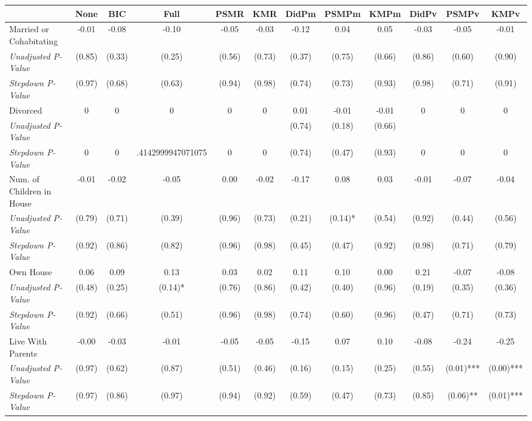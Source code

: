 \begin{tabular}{l c c c c c c c c c c c}
\toprule
 & None & BIC & Full & PSMR & KMR & DidPm & PSMPm & KMPm & DidPv & PSMPv & KMPv \\
\midrule
Married or Cohabitating & -0.01 & -0.08 & -0.10 & -0.05 & -0.03 & -0.12 & 0.04 & 0.05 & -0.03 & -0.05 & -0.01 \\
\quad \textit{Unadjusted P-Value} & (0.85) & (0.33) & (0.25) & (0.56) & (0.73) & (0.37) & (0.75) & (0.66) & (0.86) & (0.60) & (0.90) \\
\quad \textit{Stepdown P-Value} & (0.97) & (0.68) & (0.63) & (0.94) & (0.98) & (0.74) & (0.73) & (0.93) & (0.98) & (0.71) & (0.91) \\
Divorced & 0 & 0 & 0 & 0 & 0 & 0.01 & -0.01 & -0.01 & 0 & 0 & 0 \\
\quad \textit{Unadjusted P-Value} & & & & & & (0.74) & (0.18) & (0.66) & & & \\
\quad \textit{Stepdown P-Value} & 0 & 0 & .4142999947071075 & 0 & 0 & (0.74) & (0.47) & (0.93) & 0 & 0 & 0 \\
Num. of Children in House & -0.01 & -0.02 & -0.05 & 0.00 & -0.02 & -0.17 & 0.08 & 0.03 & -0.01 & -0.07 & -0.04 \\
\quad \textit{Unadjusted P-Value} & (0.79) & (0.71) & (0.39) & (0.96) & (0.73) & (0.21) & (0.14)* & (0.54) & (0.92) & (0.44) & (0.56) \\
\quad \textit{Stepdown P-Value} & (0.92) & (0.86) & (0.82) & (0.96) & (0.98) & (0.45) & (0.47) & (0.92) & (0.98) & (0.71) & (0.79) \\
Own House & 0.06 & 0.09 & 0.13 & 0.03 & 0.02 & 0.11 & 0.10 & 0.00 & 0.21 & -0.07 & -0.08 \\
\quad \textit{Unadjusted P-Value} & (0.48) & (0.25) & (0.14)* & (0.76) & (0.86) & (0.42) & (0.40) & (0.96) & (0.19) & (0.35) & (0.36) \\
\quad \textit{Stepdown P-Value} & (0.92) & (0.66) & (0.51) & (0.96) & (0.98) & (0.74) & (0.60) & (0.96) & (0.47) & (0.71) & (0.73) \\
Live With Parents & -0.00 & -0.03 & -0.01 & -0.05 & -0.05 & -0.15 & 0.07 & 0.10 & -0.08 & -0.24 & -0.25 \\
\quad \textit{Unadjusted P-Value} & (0.97) & (0.62) & (0.87) & (0.51) & (0.46) & (0.16) & (0.15) & (0.25) & (0.55) & (0.01)*** & (0.00)*** \\
\quad \textit{Stepdown P-Value} & (0.97) & (0.86) & (0.97) & (0.94) & (0.92) & (0.59) & (0.47) & (0.73) & (0.85) & (0.06)** & (0.01)*** \\
\bottomrule
\end{tabular}
